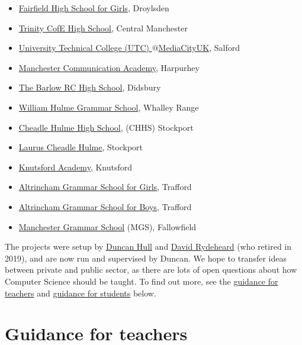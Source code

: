 \documentclass[
  12pt,
]{book}
\providecommand{\tightlist}{%
  \setlength{\itemsep}{0pt}\setlength{\parskip}{0pt}}
\begin{document}
\begin{itemize}
\tightlist
\item
  \href{http://www.fairfieldhigh.tameside.sch.uk/}{Fairfield High School for Girls}, Droylsden
\item
  \href{https://www.trinityhigh.com}{Trinity CofE High School}, Central Manchester
\item
  \href{http://www.utcmediacityuk.org.uk/}{University Technical College (UTC) \(@\)MediaCityUK}, Salford
\item
  \href{https://www.manchestercommunicationacademy.com/}{Manchester Communication Academy}, Harpurhey\\
\item
  \href{https://thebarlowrchigh.co.uk/}{The Barlow RC High School}, Didsbury
\item
  \href{https://www.whgs-academy.org/}{William Hulme Grammar School}, Whalley Range
\item
  \href{https://www.chhs.org.uk/}{Cheadle Hulme High School}, (CHHS) Stockport
\item
  \href{https://www.lauruscheadlehulme.org.uk/}{Laurus Cheadle Hulme}, Stockport
\item
  \href{https://www.knutsfordacademy.org.uk/}{Knutsford Academy}, Knutsford
\item
  \href{http://www.aggs.trafford.sch.uk/}{Altrincham Grammar School for Girls}, Trafford
\item
  \href{https://www.agsb.co.uk/}{Altrincham Grammar School for Boys}, Trafford
\item
  \href{https://www.mgs.org/}{Manchester Grammar School} (MGS), Fallowfield
\end{itemize}

The projects were setup by \protect\hyperlink{contact}{Duncan Hull} and \href{http://www.cs.man.ac.uk/~david/}{David Rydeheard} (who retired in 2019), and are now run and supervised by Duncan. We hope to transfer ideas between private and public sector, as there are lots of open questions about how Computer Science should be taught. \citep{cse, suemcr, stephenson, fincherpetre} To find out more, see the \protect\hyperlink{guidance-for-teachers}{guidance for teachers} and \protect\hyperlink{guidance-for-students}{guidance for students} below.

\hypertarget{guidance-for-teachers}{%
\section{Guidance for teachers}\label{guidance-for-teachers}}
\end{document}
